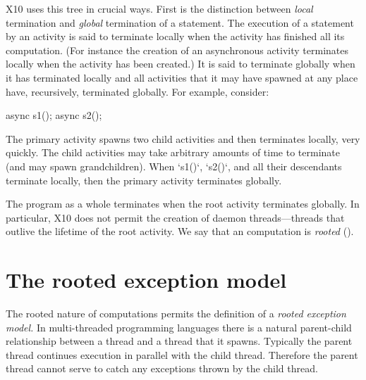 X10 uses this tree in crucial ways.  
First is the distinction 
between {\em local} termination and {\em global}
termination of a statement. The execution of a statement by an
activity is said to terminate locally when the activity has finished
all its computation. (For instance the
creation of an asynchronous activity terminates locally when the
activity has been created.)  It is said to terminate globally when it
has terminated locally and all activities that it may have spawned at
any place have, recursively, terminated globally.
For example, consider: 
\begin{xten}
async {s1();}
async {s2();}
\end{xten}
The primary activity spawns two child activities and then terminates locally,
very quickly.  The child activities may take arbitrary amounts of time to
terminate (and may spawn grandchildren).  When \xcd`s1()`, \xcd`s2()`, and
all their descendants terminate locally, then the primary activity terminates
globally. 

The program as a whole terminates when the root activity terminates globally.
In particular, X10 does not permit the creation of 
daemon threads---threads that outlive the lifetime of the root
activity.  We say that an \Xten{} computation is {\em rooted}
().


\section{The \Xten{} rooted exception model}
\label{ExceptionModel}


The rooted nature of \Xten{} computations permits the definition of a
{\em rooted exception model.} In multi-threaded programming languages
there is a natural parent-child relationship between a thread and a
thread that it spawns. Typically the parent thread continues execution
in parallel with the child thread. Therefore the parent thread cannot
serve to catch any exceptions thrown by the child thread. 

